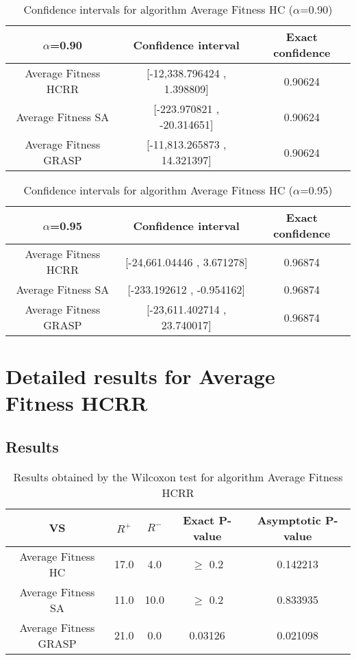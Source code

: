 \documentclass[a4paper,10pt]{article}
\begin{document}
\begin{table}[!htp]
\centering\small
\begin{tabular}{
|c|c|c|}
\hline
 $\alpha$=0.90 & Confidence interval & Exact confidence \\ \hline 
Average Fitness HCRR    & [-12,338.796424 , 1.398809] & 0.90624\\ \hline 
Average Fitness SA   & [-223.970821 , -20.314651] & 0.90624\\ \hline 
Average Fitness GRASP & [-11,813.265873 , 14.321397] & 0.90624\\ \hline 

\end{tabular}
\caption{Confidence intervals for algorithm Average Fitness HC     ($\alpha$=0.90)}
\end{table}
\begin{table}[!htp]
\centering\small
\begin{tabular}{
|c|c|c|}
\hline
 $\alpha$=0.95 & Confidence interval & Exact confidence \\ \hline 
Average Fitness HCRR    & [-24,661.04446 , 3.671278] & 0.96874\\ \hline 
Average Fitness SA   & [-233.192612 , -0.954162] & 0.96874\\ \hline 
Average Fitness GRASP & [-23,611.402714 , 23.740017] & 0.96874\\ \hline 

\end{tabular}
\caption{Confidence intervals for algorithm Average Fitness HC     ($\alpha$=0.95)}
\end{table}

 \clearpage 


\section{Detailed results for Average Fitness HCRR   }


\subsection{Results}

\begin{table}[!htp]
\centering\small
\begin{tabular}{
|c|c|c|c|c|}
\hline
 VS & $R^{+}$ & $R^{-}$ & Exact P-value & Asymptotic P-value \\ \hline 
Average Fitness HC     & 17.0 & 4.0 & $\geq$ 0.2 & 0.142213\\ \hline 
Average Fitness SA   & 11.0 & 10.0 & $\geq$ 0.2 & 0.833935\\ \hline 
Average Fitness GRASP & 21.0 & 0.0 & 0.03126 & 0.021098\\ \hline 

\end{tabular}
\caption{Results obtained by the Wilcoxon test for algorithm Average Fitness HCRR   }
\end{table}
\end{document}

